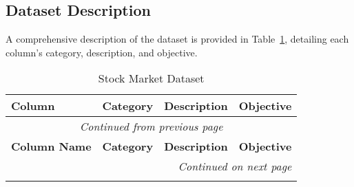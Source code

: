 \clearpage
\subsection{Dataset Description}
\label{app:dataset}

A comprehensive description of the dataset is provided in Table~\ref{tab:dataset_structure}, detailing each column's category, description, and objective.

\begin{longtable}{llp{5cm}p{5cm}}
    \caption{Stock Market Dataset}\label{tab:dataset_structure} \\
    \hline
    \textbf{Column} & \textbf{Category} & \textbf{Description} & \textbf{Objective}  \\
    \hline
    \endfirsthead

    \multicolumn{4}{c}{\textit{Continued from previous page}} \\
    \hline
    \textbf{Column Name} & \textbf{Category} & \textbf{Description} & \textbf{Objective} \\
    \hline
    \endhead

    \hline \multicolumn{4}{r}{\textit{Continued on next page}} \\
    \endfoot


\end{longtable}
